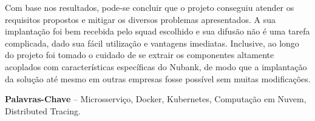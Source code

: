 \begin{resumo}
	Com base nos resultados, pode-se concluir que o projeto conseguiu atender os requisitos propostos e mitigar os diversos problemas apresentados. A sua implantação foi bem recebida pelo squad escolhido e sua difusão não é uma tarefa complicada, dado sua fácil utilização e vantagens imediatas. Inclusive, ao longo do projeto foi tomado o cuidado de se extrair os componentes altamente acoplados com características específicas do Nubank, de modo que a implantação da solução até mesmo em outras empresas fosse possível sem muitas modificações.
	
%
%
\textbf{Palavras-Chave} -- Microsserviço, Docker, Kubernetes, Computação em Nuvem, Distributed Tracing.
\end{resumo}
